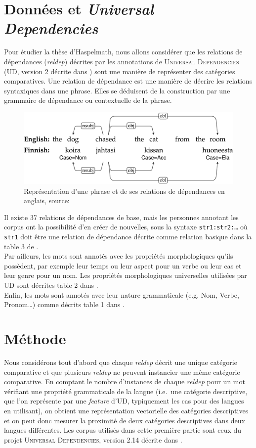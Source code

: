 \documentclass{cours}
\begin{document}
    \section{Données et \emph{Universal Dependencies}}
    Pour étudier la thèse d'Haspelmath, nous allons considérer que les relations de dépendances (\textit{reldep}) décrites par les annotations de \textsc{Universal Dependencies} (UD, version 2 décrite dans \cite{UDv2}) sont une manière de représenter des catégories comparatives.
    Une relation de dépendance est une manière de décrire les relations syntaxiques dans une phrase.
    Elles se déduisent de la construction par une grammaire de dépendance ou contextuelle de la phrase.
    \begin{figure}[H]
        \centering
        \includegraphics[width=\textwidth]{Figures/Visualisations/simplified_ud_annotation}
        \caption{Représentation d'une phrase et de ses relations de dépendances en anglais, source:\cite{UDv2}}
    \end{figure}
    Il existe 37 relations de dépendances de base, mais les personnes annotant les corpus ont la possibilité d'en créer de nouvelles, sous la syntaxe \texttt{str1:str2:\dots} où \texttt{str1} doit être une relation de dépendance décrite comme relation basique dans la table 3 de \cite{UDv2}.\\
    Par ailleurs, les mots sont annotés avec les propriétés morphologiques qu'ils possèdent, par exemple leur temps ou leur aspect pour un verbe ou leur cas et leur genre pour un nom.
    Les propriétés morphologiques universelles utilisées par UD sont décrites table 2 dans \cite{UDv2}.\\
    Enfin, les mots sont annotés avec leur nature grammaticale (e.g. Nom, Verbe, Pronom\dots) comme décrits table 1 dans \cite{UDv2}.

    \section{Méthode}
    Nous considérons tout d'abord que chaque \textit{reldep} décrit une unique catégorie comparative et que plusieurs \textit{reldep} ne peuvent instancier une même catégorie comparative.
    En comptant le nombre d'instances de chaque \textit{reldep} pour un mot vérifiant une propriété grammaticale de la langue (i.e.\ une catégorie descriptive, que l'on représente par une \textit{feature} d'UD, typiquement les cas pour des langues en utilisant), on obtient une représentation vectorielle des catégories descriptives et on peut donc mesurer la proximité de deux catégories descriptives dans deux langues différentes.
    Les corpus utilisés dans cette première partie sont ceux du projet \textsc{Universal Dependencies}, version 2.14 décrite dans \cite{UD214}.
\end{document}
